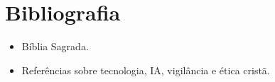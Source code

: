 \chapter*{Bibliografia}
\begin{itemize}[leftmargin=*]
  \item Bíblia Sagrada.
  \item Referências sobre tecnologia, IA, vigilância e ética cristã.
\end{itemize}
